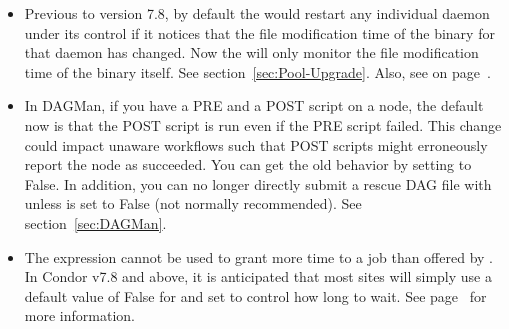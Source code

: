 \begin{itemize}
\item Previous to version 7.8, by default the  would restart any
	individual daemon under its control if it notices that the file
	modification time of the binary for that daemon has changed.  Now the
	 will only monitor the file modification time of the
	 binary itself.  See section~\ref{sec:Pool-Upgrade}.  Also,
	see  on
	page~\pageref{param:MasterNewBinaryRestart}.

\item In DAGMan, if you have a PRE and a POST script on a node, the default now
	is that the POST script is run even if the PRE script failed.   This change
	could impact unaware workflows such that POST scripts might erroneously
	report the node as succeeded. You can get the old behavior by setting
	 to False.  In addition, you can no
	longer directly submit a rescue DAG file with  unless
	 is set to False (not normally
	recommended).  See section~\ref{sec:DAGMan}.

\item The  expression cannot be used to grant more time to a job
	than offered by . In Condor v7.8 and above, it
	is anticipated that most sites will simply use a default value of False for
	 and set  to control how long
	to wait.  See page~\pageref{param:MachineMaxVacateTime} for more
	information.


\end{itemize}

